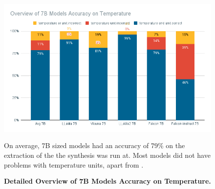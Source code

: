 \begin{figure}[!htb]
    \begin{centering}
        \includegraphics[width=\textwidth]{img/overview_7b_temp}
        \caption[7B Models Detailed Temperature Accuracy]{\textbf{Detailed Overview of 7B Models Accuracy on Temperature.}}
        On average, 7B sized models had an accuracy of 79\% on the extraction of the \ttemp the synthesis was run at.
        Most models did not have problems with temperature units, apart from .
        \label{fig:7b_temp}
    \end{centering}
\end{figure}
